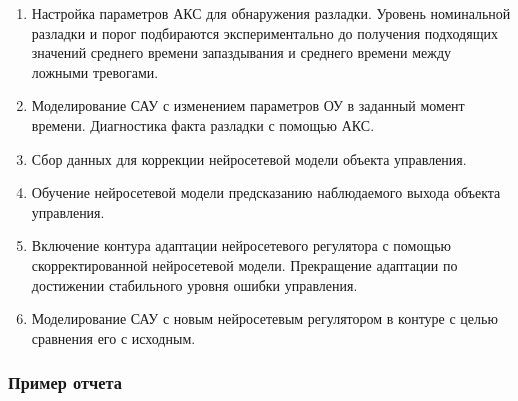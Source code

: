 \begin{enumerate}
\item Настройка параметров АКС для обнаружения разладки.  Уровень
  номинальной разладки и порог подбираются экспериментально до
  получения подходящих значений среднего времени запаздывания и
  среднего времени между ложными тревогами.
\item Моделирование САУ с изменением параметров ОУ в заданный момент
  времени.  Диагностика факта разладки с помощью АКС.
\item Сбор данных для коррекции нейросетевой модели объекта
  управления.
\item Обучение нейросетевой модели предсказанию наблюдаемого выхода
  объекта управления.
\item Включение контура адаптации нейросетевого регулятора с помощью
  скорректированной нейросетевой модели.  Прекращение адаптации по
  достижении стабильного уровня ошибки управления.
\item Моделирование САУ с новым нейросетевым регулятором в контуре
  с целью сравнения его с исходным.
\end{enumerate}

\subsubsection{Пример отчета}
